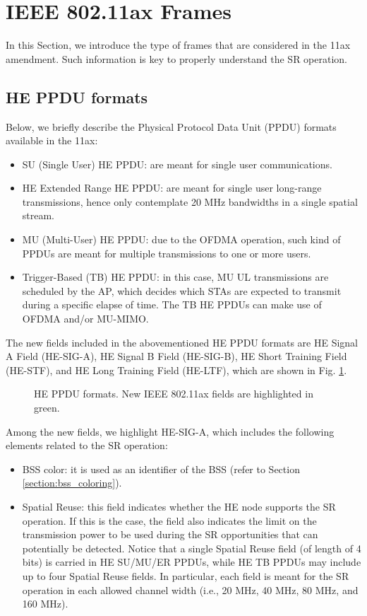 \documentclass[preprint,12pt]{elsarticle}
\begin{document}
	\appendices
	\section{IEEE 802.11ax Frames}
	\label{section:frames}
	In this Section, we introduce the type of frames that are considered in the 11ax amendment. Such information is key to properly understand the SR operation.
	
	\subsection{HE PPDU formats}
	Below, we briefly describe the Physical Protocol Data Unit (PPDU) formats available in the 11ax:
	\begin{itemize}
		\item SU (Single User) HE PPDU: are meant for single user communications.
		\item  HE Extended Range HE PPDU: are meant for single user long-range transmissions, hence only contemplate 20 MHz bandwidths in a single spatial stream.
		\item  MU (Multi-User) HE PPDU: due to the OFDMA operation, such kind of PPDUs are meant for multiple transmissions to one or more users.
		\item Trigger-Based (TB) HE PPDU: in this case, MU UL transmissions are scheduled by the AP, which decides which STAs are expected to transmit during a specific elapse of time. The TB HE PPDUs can make use of OFDMA and/or MU-MIMO.
	\end{itemize}
	
	The new fields included in the abovementioned HE PPDU formats are HE Signal A Field (HE-SIG-A), HE Signal B Field (HE-SIG-B), HE Short Training Field (HE-STF), and HE Long Training Field (HE-LTF), which are shown in Fig. \ref{fig:appendix_1}.
	\begin{figure}[ht!]
		\centering
		\caption{HE PPDU formats. New IEEE 802.11ax fields are highlighted in green.}
		\label{fig:appendix_1}
	\end{figure}
	
	Among the new fields, we highlight HE-SIG-A, which includes the following elements related to the SR operation:
	\begin{itemize}
		\item BSS color: it is used as an identifier of the BSS (refer to Section \ref{section:bss_coloring}).
		\item Spatial Reuse: this field indicates whether the HE node supports the SR operation. If this is the case, the field also indicates the limit on the transmission power to be used during the SR opportunities that can potentially be detected. Notice that a single Spatial Reuse field (of length of 4 bits) is carried in HE SU/MU/ER PPDUs,  while HE TB PPDUs may include up to four Spatial Reuse fields. In particular, each field is meant for the SR operation in each allowed channel width (i.e., 20 MHz, 40 MHz, 80 MHz, and 160 MHz).
	\end{itemize}
	
\end{document}
